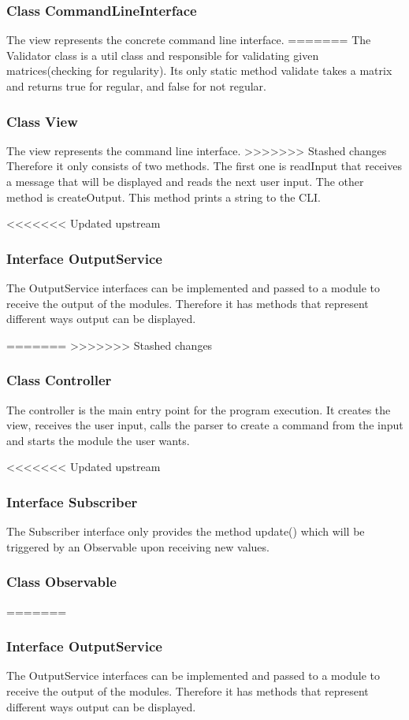 \documentclass[parskip=full]{scrartcl}
\begin{document}
\subsubsection{Class CommandLineInterface}
The view represents the concrete command line interface. 
=======
The Validator class is a util class and responsible for validating given matrices(checking for regularity).
Its only static method validate takes a matrix and returns true for regular, and false for not regular.

\subsubsection{Class View}
The view represents the command line interface. 
>>>>>>> Stashed changes
Therefore it only consists of two methods. 
The first one is readInput that receives a message that will be displayed and reads the next user input. 
The other method is createOutput. 
This method prints a string to the CLI.

<<<<<<< Updated upstream
\subsubsection{Interface OutputService}
The OutputService interfaces can be implemented and passed to a module to receive the output of the modules. 
Therefore it has methods that represent different ways output can be displayed. 

=======
>>>>>>> Stashed changes
\subsubsection{Class Controller} 
The controller is the main entry point for the program execution. 
It creates the view, receives the user input, calls the parser to create a command from the input and starts the module the user wants.

<<<<<<< Updated upstream
 \subsubsection{Interface Subscriber}
The Subscriber interface only provides the method update() which will be triggered by an Observable upon receiving new values.

\subsubsection{Class Observable} 
=======
\subsubsection{Interface OutputService}
The OutputService interfaces can be implemented and passed to a module to receive the output of the modules. 
Therefore it has methods that represent different ways output can be displayed. 
\end{document}
